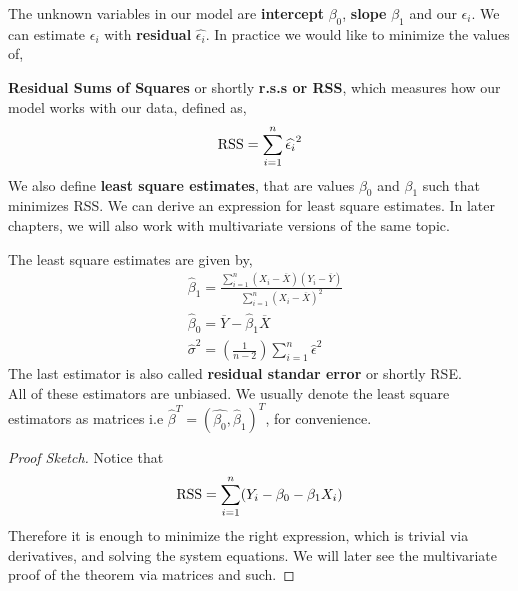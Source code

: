 The unknown variables in our model are \textbf{intercept} $\beta_0$, \textbf{slope} $\beta_1$ and our $\epsilon_i$. We can estimate $\epsilon_i$ with \textbf{residual} $\widehat{\epsilon_i}$. 
In practice we would like to minimize the values of,
\begin{definition}
    \textbf{Residual Sums of Squares} or shortly \textbf{r.s.s or RSS},
    which measures how our model works with our data, defined as,
    \[\operatorname{RSS} = \sum_{i=1}^n \widehat{\epsilon_i}^2 \]
We also define \textbf{least square estimates}, that are values 
$\beta_0$ and $\beta_1$ such that minimizes RSS.
We can derive an expression for least square estimates. In later chapters, we will also work with multivariate versions of the same topic.
\begin{theorem}
    The least square estimates are given by,
    \begin{align*} &\widehat{\beta}_1 = \frac{\sum_{i = 1}^n(X_i - \overline{X})(Y_i - \overline{Y})}{\sum_{i = 1}^n (X_i - \overline{X})^2} \\
        &\widehat{\beta}_0 = \overline{Y} - \widehat{\beta}_1\overline{X} \\
        &\widehat{\sigma}^2 = \left( \frac{1}{n-2}\right)\sum_{i=1}^n \widehat{\epsilon}^2
\end{align*}
The last estimator is also called \textbf{residual standar error} or shortly RSE.\\
All of these estimators are unbiased.
We usually denote the least square estimators as matrices i.e $\widehat{\beta}^T = (\widehat{\beta_0},\widehat{\beta}_1)^T$, for convenience.
\begin{proof}[Proof Sketch]
    Notice that
    \[\operatorname{RSS} = \sum_{i=1}^n (Y_i - \beta_0 -\beta_1X_i) \]
    Therefore it is enough to minimize the right expression, which is trivial via derivatives, and solving the system equations. We will later see the multivariate proof of the theorem via matrices and such.
\end{proof}
\end{theorem}
\end{definition}
